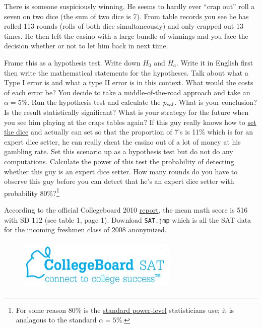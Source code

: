 \documentclass[12pt]{article}
\begin{document}
There is someone suspiciously winning. He seems to hardly ever ``crap out'' \ie roll a seven on two dice (the sum of two dice is 7). From table records you see he has rolled 113 rounds (rolls of both dice simultaneously) and only crapped out 13 times. He then left the casino with a large bundle of winnings and you face the decision whether or not to let him back in next time.

\benum
\intermediatesubproblem Frame this as a hypothesis test. Write down $H_0$ and $H_a$. Write it in English first then write the mathematical statements for the hypotheses.
\easysubproblem Talk about what a Type I error is and what a type II error is in this context.
\easysubproblem What would the costs of each error be?
\intermediatesubproblem You decide to take a middle-of-the-road approach and take an $\alpha = 5\%$. Run the hypothesis test and calculate the $p_{\text{val}}$.
\easysubproblem What is your conclusion? Is the result statistically significant?
\intermediatesubproblem What is your strategy for the future when you see him playing at the craps tables again?
\easysubproblem If this guy really knows how to \href{http://en.wikipedia.org/wiki/Dice_setting}{set the dice} and actually can set so that the proportion of 7's is 11\% which is for an expert dice setter, he can really cheat the casino out of a lot of money at his gambling rate. Set this scenario up as a hypothesis test but do not do any computations.
\hardsubproblem Calculate the power of this test \ie the probability of detecting whether this guy is an expert dice setter.
\hardsubproblem How many rounds do you have to observe this guy before you can detect that he's an expert dice setter with probability 80\%?\footnote{For some reason 80\% is the \href{http://en.wikipedia.org/wiki/Statistical_power}{standard power-level} statisticians use; it is analagous to the standard $\alpha=5\%$.}
\eenum

\problem According to the official Collegeboard 2010 \href{http://professionals.collegeboard.com/profdownload/2010-total-group-profile-report-cbs.pdf}{report}, the mean math score is 516 with SD 112 (see table 1, page 1). Download \texttt{SAT.jmp} which is all the SAT data for the incoming freshmen class of 2008 anonymized.

\begin{figure}[htp]
\centering
\includegraphics[width=3in,height=0.96in]{sat_logo.jpg}
\end{figure}
\FloatBarrier
\end{document}
